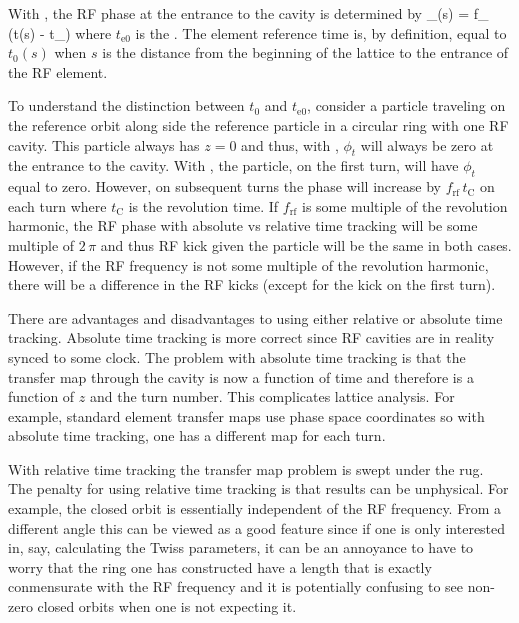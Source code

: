 With , the RF phase at the entrance to the
cavity is determined by
\Begineq
  \phi_(s) = f_ \, (t(s) - t_)
\Endeq
where $t_\text{e0}$ is the . The element
reference time is, by definition, equal to $t_{0}(s)$ when $s$ is the
distance from the beginning of the lattice to the entrance of the RF
element. 

To understand the distinction between $t_0$ and $t_\text{e0}$,
consider a particle traveling on the reference orbit along side the
reference particle in a circular ring with one RF cavity. This
particle always has $z = 0$ and thus, with , $\phi_t$ will always be zero at the entrance to the cavity.
With , the particle, on the first turn,
will have $\phi_t$ equal to zero. However, on subsequent turns the
phase will increase by $f_\text{rf} \, t_\text{C}$ on each turn where
$t_\text{C}$ is the revolution time. If $f_\text{rf}$ is some multiple
of the revolution harmonic, the RF phase with absolute vs relative
time tracking will be some multiple of $2 \, \pi$ and thus RF kick
given the particle will be the same in both cases. However, if the RF
frequency is not some multiple of the revolution harmonic, there will
be a difference in the RF kicks (except for the kick on the first
turn).

There are advantages and disadvantages to using either relative or
absolute time tracking. Absolute time tracking is more correct since
RF cavities are in reality synced to some clock. The problem with
absolute time tracking is that the transfer map through the cavity is
now a function of time and therefore is a function of $z$ and the turn
number.  This complicates lattice analysis. For example, standard
element transfer maps use phase space coordinates so with absolute
time tracking, one has a different map for each turn.

With relative time tracking the transfer map problem is swept under
the rug. The penalty for using relative time tracking is that results
can be unphysical. For example, the closed orbit is essentially
independent of the RF frequency. From a different angle this can be
viewed as a good feature since if one is only interested in, say,
calculating the Twiss parameters, it can be an annoyance to have to
worry that the ring one has constructed have a length that is exactly
conmensurate with the RF frequency and it is potentially confusing to
see non-zero closed orbits when one is not expecting it.

